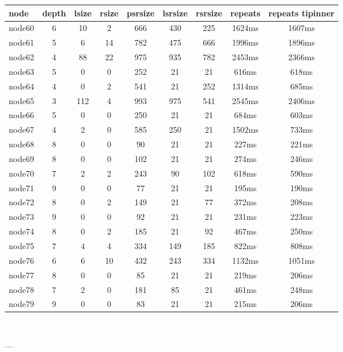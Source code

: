 \begin{tabular}{|l|c|c|c|c|c|c|c|c|}
\hline node & depth & lsize & rsize & psrsize & lsrsize & rsrsize   & repeats & repeats tipinner\\
    \hline node60 & 6 & 10 & 2 & 666 & 430 & 225 & 1624ms & 1607ms\\
    \hline node61 & 5 & 6 & 14 & 782 & 475 & 666 & 1996ms & 1896ms\\
    \hline node62 & 4 & 88 & 22 & 975 & 935 & 782 & 2453ms & 2366ms\\
    \hline node63 & 5 & 0 & 0 & 252 & 21 & 21 & 616ms & 618ms\\
    \hline node64 & 4 & 0 & 2 & 541 & 21 & 252 & 1314ms & 685ms\\
    \hline node65 & 3 & 112 & 4 & 993 & 975 & 541 & 2545ms & 2406ms\\
    \hline node66 & 5 & 0 & 0 & 250 & 21 & 21 & 684ms & 603ms\\
    \hline node67 & 4 & 2 & 0 & 585 & 250 & 21 & 1502ms & 733ms\\
    \hline node68 & 8 & 0 & 0 & 90 & 21 & 21 & 227ms & 221ms\\
    \hline node69 & 8 & 0 & 0 & 102 & 21 & 21 & 274ms & 246ms\\
    \hline node70 & 7 & 2 & 2 & 243 & 90 & 102 & 618ms & 590ms\\
    \hline node71 & 9 & 0 & 0 & 77 & 21 & 21 & 195ms & 190ms\\
    \hline node72 & 8 & 0 & 2 & 149 & 21 & 77 & 372ms & 208ms\\
    \hline node73 & 9 & 0 & 0 & 92 & 21 & 21 & 231ms & 223ms\\
    \hline node74 & 8 & 0 & 2 & 185 & 21 & 92 & 467ms & 250ms\\
    \hline node75 & 7 & 4 & 4 & 334 & 149 & 185 & 822ms & 808ms\\
    \hline node76 & 6 & 6 & 10 & 432 & 243 & 334 & 1132ms & 1051ms\\
    \hline node77 & 8 & 0 & 0 & 85 & 21 & 21 & 219ms & 206ms\\
    \hline node78 & 7 & 2 & 0 & 181 & 85 & 21 & 461ms & 248ms\\
    \hline node79 & 9 & 0 & 0 & 83 & 21 & 21 & 215ms & 206ms\\

\hline
\end{tabular} \

---


